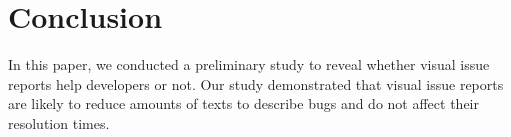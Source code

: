\section{Conclusion}
\label{sec:conclusion}

In this paper, we conducted a preliminary study to reveal  
whether visual issue reports help developers or not. 
Our study demonstrated that visual issue reports are likely to reduce amounts of texts to describe bugs and do not affect their resolution times. 




